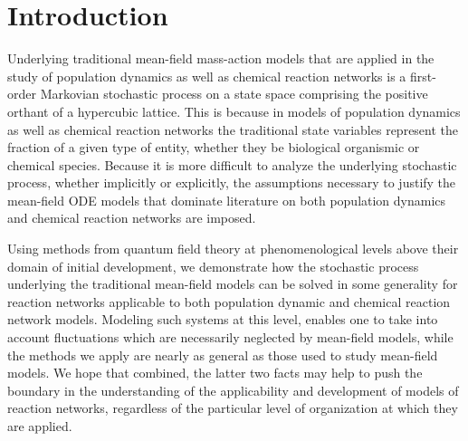 \section{Introduction}\label{sec:intro}
Underlying traditional mean-field mass-action models that are applied in the study of population dynamics as well as chemical reaction networks is a first-order Markovian stochastic process on a state space comprising the positive orthant of a hypercubic lattice. This is because in models of population dynamics as well as chemical reaction networks the traditional state variables represent the fraction of a given type of entity, whether they be biological organismic or chemical species. Because it is more difficult to analyze the underlying stochastic process, whether implicitly or explicitly, the assumptions necessary to justify the mean-field ODE models that dominate literature on both population dynamics and chemical reaction networks are imposed.


Using methods from quantum field theory at phenomenological levels above their domain of initial development, we demonstrate how the stochastic process underlying the traditional mean-field models can be solved in some generality for reaction networks applicable to both population dynamic and chemical reaction network models. Modeling such systems at this level, enables one to take into account fluctuations which are necessarily neglected by mean-field models, while the methods we apply are nearly as general as those used to study mean-field models. We hope that combined, the latter two facts may help to push the boundary in the understanding of the applicability and development of models of reaction networks, regardless of the particular level of organization at which they are applied.
